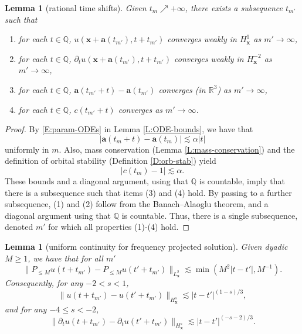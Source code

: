 \documentclass[12pt,letterpaper]{amsart}
\newtheorem{lemma}[theorem]{Lemma}
\theoremstyle{remark}
\numberwithin{equation}{section}
\numberwithin{theorem}{section}
\numberwithin{table}{section}
\begin{document}
\begin{lemma}[rational time shifts]
\label{L:wk-1}
Given $t_m\nearrow +\infty$, there exists a subsequence $t_{m'}$ such that 
\begin{enumerate}
\item 
for each $t\in \mathbb{Q}$, $u(\mathbf{x}+\mathbf{a}(t_{m'}),t+t_{m'})$ converges weakly in $H^1_{\mathbf{x}}$ as $m'\to\infty$,
\item 
for each $t\in \mathbb{Q}$, $\partial_t u (\mathbf{x}+\mathbf{a}(t_{m'}),t+t_{m'})$ converges weakly in $H^{-2}_{\mathbf{x}}$ as $m'\to \infty$,
\item 
for each $t\in \mathbb{Q}$, $\mathbf{a}(t_{m'}+t) - \mathbf{a}(t_{m'})$ converges (in $\mathbb{R}^3$) as $m'\to \infty$,
\item 
for each $t\in \mathbb{Q}$, $c(t_{m'}+t)$ converges as $m'\to \infty$.
\end{enumerate}
\end{lemma}

\begin{proof}
By \eqref{E:param-ODEs} in Lemma \ref{L:ODE-bounds}, we have that
$$
|\mathbf{a}(t_{m}+t) - \mathbf{a}(t_{m})| \lesssim \alpha |t|
$$
uniformly in $m$.  Also, mass conservation (Lemma \ref{L:mass-conservation}) and the definition of orbital stability (Definition \ref{D:orb-stab}) yield
$$
| c(t_{m}) -1 | \lesssim \alpha.
$$
These bounds and a diagonal argument, using that $\mathbb{Q}$ is countable, imply that there is a subsequence such that items (3) and (4) hold.  By passing to a further subsequence, (1) and (2) follow from the Banach--Alaoglu theorem, and a diagonal argument using that $\mathbb{Q}$ is countable.   Thus, there is a single subsequence, denoted $m'$ for which all properties (1)-(4) hold.
\end{proof}

\begin{lemma}[uniform continuity for frequency projected solution]
\label{L:wk-2}
Given dyadic $M\geq 1$, we have that for all $m'$
\begin{equation}
\label{E:wk-106}
\| P_{\leq M} u( t+t_{m'}) - P_{\leq M} u(t'+t_{m'}) \|_{L^2_{\mathbf{x}}} \lesssim \min(M^2 |t-t'|, M^{-1}).
\end{equation}
Consequently, for any $-2<s<1$,
\begin{equation}
\label{E:wk-106b}
\| u( t+t_{m'}) -  u(t'+t_{m'}) \|_{H^s_{\mathbf{x}}} \lesssim |t-t'|^{(1-s)/3},
\end{equation}
and for any $-4\leq s<-2$,
\begin{equation}
\label{E:wk-107b}
\|  \partial_t u( t+t_{m'}) - \partial_t u(t'+t_{m'}) \|_{H^s_{\mathbf{x}}} \lesssim |t-t'|^{(-s-2)/3}.
\end{equation}
\end{lemma}
\end{document}
